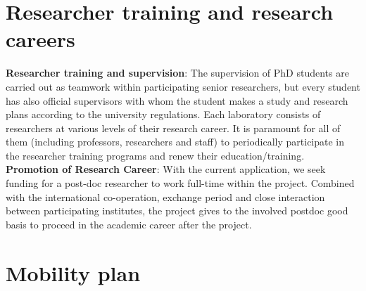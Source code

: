 \documentclass{article}
\begin{document}
\section{Researcher training and research careers}
\textbf{Researcher training and supervision}: The supervision of PhD students are carried out as teamwork within participating senior researchers, 
but every student has also official supervisors with whom the student makes a study and research plans according to the university regulations. 
Each laboratory consists of researchers at various levels of their research career. 
It is paramount for all of them (including professors, researchers and staff) to periodically participate in the researcher training programs and renew their education/training.\\ 
\textbf{Promotion of Research Career}: With the current application, we seek funding for a post-doc researcher to work full-time within the project. 
Combined with the international co-operation, exchange period and close interaction between participating institutes, the project gives to the involved postdoc good basis to proceed in the academic career after the project.

\section{Mobility plan}





\end{document}
